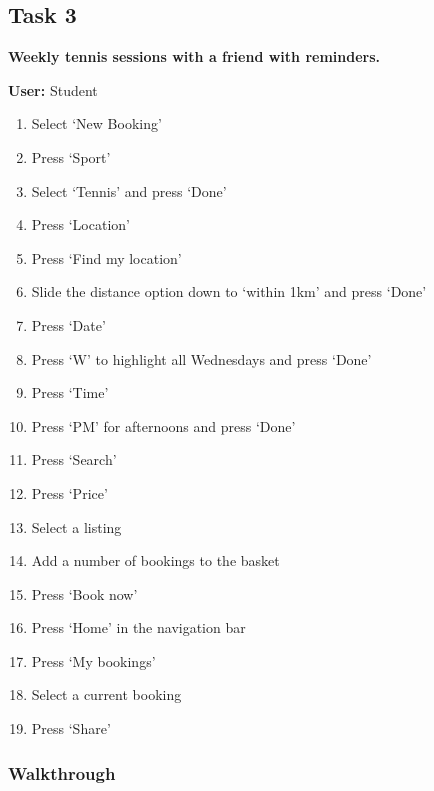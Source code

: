 \subsection{Task 3}
\label{ssub:task_3}

\textbf{Weekly tennis sessions with a friend with reminders.}

\textbf{User:} Student
\begin{enumerate}
	\item Select `New Booking'
	\item Press `Sport'
	\item Select `Tennis' and press `Done'
	\item Press `Location'
	\item Press `Find my location'
	\item Slide the distance option down to `within 1km' and press `Done'
	\item Press `Date'
	\item Press `W' to highlight all Wednesdays and press `Done'
	\item Press `Time'
	\item Press `PM' for afternoons and press `Done'
	\item Press `Search'
	\item Press `Price'
	\item Select a listing
	\item Add a number of bookings to the basket
	\item Press `Book now'
	\item Press `Home' in the navigation bar
	\item Press `My bookings'
	\item Select a current booking
	\item Press `Share'
\end{enumerate}

\subsubsection{Walkthrough}

